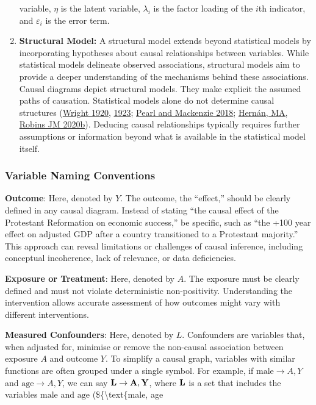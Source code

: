 \documentclass[
  singlecolumn]{report}
\begin{document}
\begin{enumerate}
  variable, \(\eta\) is the latent variable, \(\lambda_i\) is the factor
  loading of the \(i\)th indicator, and \(\varepsilon_i\) is the error
  term.
\item
  \textbf{Structural Model:} A structural model extends beyond
  statistical models by incorporating hypotheses about causal
  relationships between variables. While statistical models delineate
  observed associations, structural models aim to provide a deeper
  understanding of the mechanisms behind these associations. Causal
  diagrams depict structural models. They make explicit the assumed
  paths of causation. Statistical models alone do not determine causal
  structures (\protect\hyperlink{ref-wright1920}{Wright 1920},
  \protect\hyperlink{ref-wright1923}{1923};
  \protect\hyperlink{ref-pearl2018}{Pearl and Mackenzie 2018};
  \protect\hyperlink{ref-hernuxe1nmarobinsjm2020a}{Hernán, MA, Robins JM
  2020b}). Deducing causal relationships typically requires further
  assumptions or information beyond what is available in the statistical
  model itself.
\end{enumerate}

\hypertarget{variable-naming-conventions}{%
\subsubsection{Variable Naming
Conventions}\label{variable-naming-conventions}}

\textbf{Outcome}: Here, denoted by \(Y\). The outcome, the ``effect,''
should be clearly defined in any causal diagram. Instead of stating
``the causal effect of the Protestant Reformation on economic success,''
be specific, such as ``the +100 year effect on adjusted GDP after a
country transitioned to a Protestant majority.'' This approach can
reveal limitations or challenges of causal inference, including
conceptual incoherence, lack of relevance, or data deficiencies.

\textbf{Exposure or Treatment}: Here, denoted by \(A\). The exposure
must be clearly defined and must not violate deterministic
non-positivity. Understanding the intervention allows accurate
assessment of how outcomes might vary with different interventions.

\textbf{Measured Confounders}: Here, denoted by \(L\). Confounders are
variables that, when adjusted for, minimise or remove the non-causal
association between exposure \(A\) and outcome \(Y\). To simplify a
causal graph, variables with similar functions are often grouped under a
single symbol. For example, if \(\text{male} \to A, Y\) and
\(\text{age} \to A, Y\), we can say \(\bf{L} \to A, Y\), where
\(\bf{L}\) is a set that includes the variables \(\text{male}\) and
\(\text{age}\) (\$\{\textbackslash text\{male, age
\end{document}
